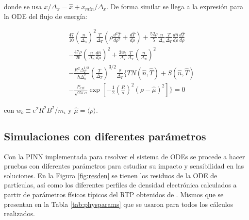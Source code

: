 donde se usa $x / \Delta_x =\hat{x} + x_{min}/\Delta_x$. De forma similar se llega a la expresión para la ODE del flujo de energía:

\begin{eqnarray}\label{eq:energyODEnorm}
	&& \frac{47}{10}\left(\frac{n}{\Delta_n}\right)^2\frac{T}{\Delta_T}\left(\rho\frac{d^2\hat{T}}{d\rho^2} + \frac{d\hat{T}}{d\rho}\right) +  \frac{52\rho}{5}\frac{n}{\Delta_n}\frac{T}{\Delta_T}\frac{d\hat{n}}{d\rho}\frac{d\hat{T}}{d\rho} \nonumber\\
	&& -\frac{47\rho}{20}\left(\frac{n}{\Delta_n}\frac{d\hat{n}}{d\rho}\right)^2 + \frac{3w_b}{\Delta_T}\frac{T}{\Delta_T}\left(\frac{n}{\Delta_n}\right)^2 \nonumber\\ 
	&&- \frac{R^2\Delta_T^{1/2}}{h\Delta_n^2}\left(\frac{T}{\Delta_T}\right)^{3/2}\frac{\rho}{\Delta_T} \biggl\{TN(\hat{n},\hat{T})+S(\hat{n},\hat{T})\nonumber\\
	&&-\frac{P_{ext}}{\sqrt{2\pi}\sigma}\exp{\left[-\frac{1}{2}\left(\frac{R}{\sigma}\right)^2(\rho-\hat{\mu})^2\right]}\biggl\} = 0
\end{eqnarray}

con $w_b \equiv e^2R^2B^2 / m_i$ y $\hat{\mu} = \langle \rho \rangle$. 

\subsection{Simulaciones con diferentes parámetros}

Con la PINN implementada para resolver el sistema de ODEs se procede a hacer pruebas con diferentes parámetros para estudiar su impacto y sensibilidad en las soluciones. En la Figura \ref{fig:resden} se tienen los residuos de la ODE de partículas, así como los diferentes perfiles de densidad electrónica calculados a partir de parámetros físicos típicos del RTP obtenidos de \cite{donne1994, roach2008}. Mismos que se presentan en la Tabla \ref{tab:physparams} que se usaron para todos los cálculos realizados.


